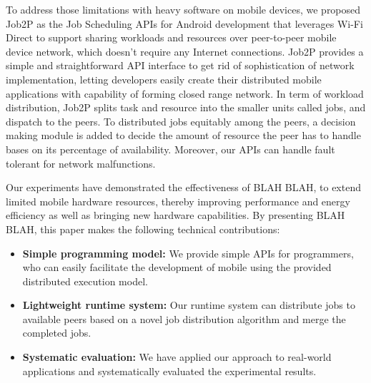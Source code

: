\documentclass[conference]{IEEEtran}
\begin{document}

To address those limitations with heavy software on mobile devices, we proposed Job2P as the Job Scheduling APIs for Android development that leverages Wi-Fi Direct to support sharing workloads and resources over peer-to-peer mobile device network, which doesn't require any Internet connections. Job2P provides a simple and straightforward API interface to get rid of sophistication of network implementation, letting developers easily create their distributed mobile applications with capability of forming closed range network. In term of workload distribution, Job2P splits task and resource into the smaller units called jobs, and dispatch to the peers. To distributed jobs equitably among the peers, a decision making module is added to decide the amount of resource the peer has to handle bases on its percentage of availability. Moreover, our APIs can handle fault tolerant for network malfunctions.

Our experiments have demonstrated the effectiveness of BLAH BLAH, to extend limited mobile hardware resources, thereby improving performance and energy efficiency as well as bringing new hardware capabilities. By presenting BLAH BLAH, this paper makes the following technical contributions:
\begin{itemize}
	\item \textbf{Simple programming model:} We provide simple APIs for programmers, who can easily facilitate the development of mobile using the provided distributed execution model.
	\item \textbf{Lightweight runtime system:} Our runtime system can distribute jobs to available peers based on a novel job distribution algorithm and merge the completed jobs. 	
	\item \textbf{Systematic evaluation:} We have applied our approach to real-world applications and systematically evaluated the experimental results.
\end{itemize}
\end{document}

